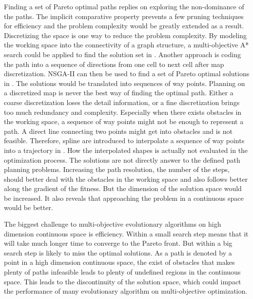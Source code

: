 \documentclass[conference]{IEEEtran}
\begin{document}
Finding a set of Pareto optimal paths replies on exploring the non-dominance of the paths.
The implicit comparative property prevents a few pruning techniques for efficiency and the problem complexity would be greatly extended as a result.
Discretizing the space is one way to reduce the problem complexity.
By modeling the working space into the connectivity of a graph structure, a multi-objective A* search could be applied to find the solution set in \cite{Mandow:2005:NAM:1642293.1642328}.
Another approach is coding the path into a sequence of directions from one cell to next cell after map discretization.
NSGA-II can then be used to find a set of Pareto optimal solutions in \cite{Ahmed2013}.
The solutions would be translated into sequences of way points.
Planning on a discretized map is never the best way of finding the optimal path.
Either a coarse discretization loses the detail information, or a fine discretization brings too much redundancy and complexity.
Especially when there exists obstacles in the working space, a sequence of way points might not be enough to represent a path.
A direct line connecting two points might get into obstacles and is not feasible.  
Therefore, spline are introduced to interpolate a sequence of way points into a trajectory in \cite{6181426}.
How the interpolated shapes is actually not evaluated in the optimization process. 
The solutions are not directly answer to the defined path planning problems.
Increasing the path resolution, the number of the steps, should better deal with the obstacles in the working space and also follows better along the gradient of the fitness.
But the dimension of the solution space would be increased.
It also reveals that approaching the problem in a continuous space would be better.

The biggest challenge to multi-objective evolutionary algorithms on high dimension continuous space is efficiency.
Within a small search step means that it will take much longer time to converge to the Pareto front.
But within a big search step is likely to miss the optimal solutions.
As a path is denoted by a point in a high dimension continuous space, the exist of obstacles that makes plenty of paths infeasible leads to plenty of undefined regions in the continuous space.
This leads to the discontinuity of the solution space, which could impact the performance of many evolutionary algorithm on multi-objective optimization.
\end{document}
